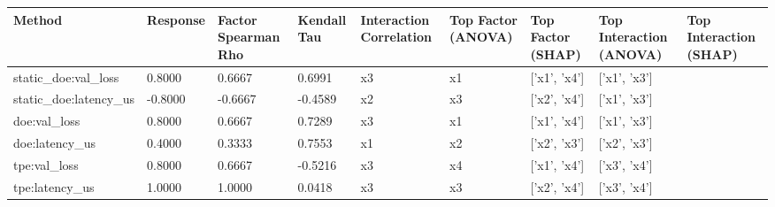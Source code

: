 \begin{tabular}{llllllll}
\toprule
Method & Response & Factor Spearman Rho & Kendall Tau & Interaction Correlation & Top Factor (ANOVA) & Top Factor (SHAP) & Top Interaction (ANOVA) & Top Interaction (SHAP) \\
\midrule
static_doe:val_loss & 0.8000 & 0.6667 & 0.6991 & x3 & x1 & ['x1', 'x4'] & ['x1', 'x3'] \\
static_doe:latency_us & -0.8000 & -0.6667 & -0.4589 & x2 & x3 & ['x2', 'x4'] & ['x1', 'x3'] \\
doe:val_loss & 0.8000 & 0.6667 & 0.7289 & x3 & x1 & ['x1', 'x4'] & ['x1', 'x3'] \\
doe:latency_us & 0.4000 & 0.3333 & 0.7553 & x1 & x2 & ['x2', 'x3'] & ['x2', 'x3'] \\
tpe:val_loss & 0.8000 & 0.6667 & -0.5216 & x3 & x4 & ['x1', 'x4'] & ['x3', 'x4'] \\
tpe:latency_us & 1.0000 & 1.0000 & 0.0418 & x3 & x3 & ['x2', 'x4'] & ['x3', 'x4'] \\
\bottomrule
\end{tabular}
